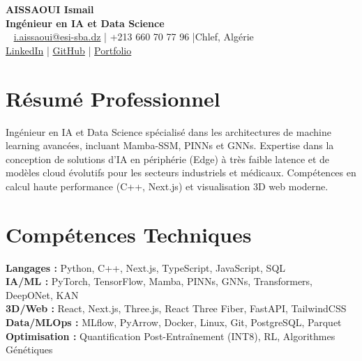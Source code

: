\documentclass[a4paper,10pt]{article}
\begin{document}
\sloppy

\begin{center}
    {\Huge\bfseries\color{titleblue} AISSAOUI Ismail}\\[1pt]
    {\LARGE\bfseries Ingénieur en IA et Data Science}\\\  %
    {    \href{mailto:i.aissaoui@esi-sba.dz}{i.aissaoui@esi-sba.dz} \quad|\quad
    +213 660 70 77 96 \quad|\quad Chlef, Algérie \\  %
    \href{https://linkedin.com/in/aissaoui-ismail-6a77a92a7}{LinkedIn} \quad|\quad
    \href{https://github.com/i-aissaoui}{GitHub} \quad|\quad
    \href{https://ismail-aissaoui.vercel.app}{Portfolio}
    }
\end{center}

\section{Résumé Professionnel}
Ingénieur en IA et Data Science spécialisé dans les architectures de machine learning avancées, incluant Mamba-SSM, PINNs et GNNs. Expertise dans la conception de solutions d'IA en périphérie (Edge) à très faible latence et de modèles cloud évolutifs pour les secteurs industriels et médicaux. Compétences en calcul haute performance (C++, Next.js) et visualisation 3D web moderne.

\section{Compétences Techniques}
\textbf{Langages :} Python, C++, Next.js, TypeScript, JavaScript, SQL \\
\textbf{IA/ML :} PyTorch, TensorFlow, Mamba, PINNs, GNNs, Transformers, DeepONet, KAN \\
\textbf{3D/Web :} React, Next.js, Three.js, React Three Fiber, FastAPI, TailwindCSS \\
\textbf{Data/MLOps :} MLflow, PyArrow, Docker, Linux, Git, PostgreSQL, Parquet \\
\textbf{Optimisation :} Quantification Post-Entraînement (INT8), RL, Algorithmes Génétiques
\end{document}

